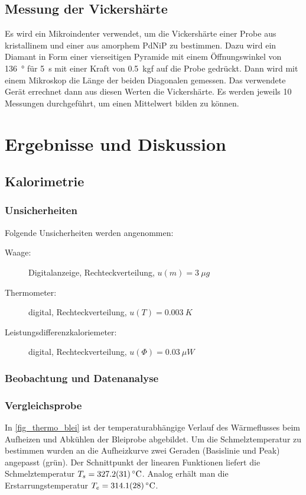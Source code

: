 \documentclass[
	a4paper,
	12pt,
	pagesize,
	ngerman
]{scrartcl}
\begin{document}
	\subsection{Messung der Vickershärte}
 	Es wird ein Mikroindenter verwendet, um die Vickershärte einer Probe aus kristallinem und einer aus amorphem PdNiP zu bestimmen. %
	Dazu wird ein Diamant in Form einer vierseitigen Pyramide mit einem Öffnungswinkel von \SI{136}{\degree} für \SI{5}{s} mit einer Kraft von \SI{0.5}{kgf} auf die Probe gedrückt.
	Dann wird mit einem Mikroskop die Länge der beiden Diagonalen gemessen.
	Das verwendete Gerät errechnet dann aus diesen Werten die Vickershärte.
	Es werden jeweils \num{10} Messungen durchgeführt, um einen Mittelwert bilden zu können.

	\section{Ergebnisse und Diskussion}

	\subsection{Kalorimetrie}
	\subsubsection{Unsicherheiten}
	Folgende Unsicherheiten werden angenommen:
	\begin{description}
		\item[Waage:]  Digitalanzeige, Rechteckverteilung, $u(m)=\SI{3}{\mu g}$
		\item[Thermometer:] digital, Rechteckverteilung, $u(T)=\SI{0.003}{K}$ %
		\item[Leistungsdifferenzkaloriemeter:] digital, Rechteckverteilung, $u(\Phi)=\SI{0.03}{\mu W}$ %
	\end{description}
	\subsubsection{Beobachtung und Datenanalyse}
	\subsubsection*{Vergleichsprobe} \label{ssss_vergleich}
	In \cref{fig_thermo_blei} ist der temperaturabhängige Verlauf des Wärmeflusses beim Aufheizen und Abkühlen  der Bleiprobe abgebildet.
	Um die Schmelztemperatur zu bestimmen wurden an die Aufheizkurve zwei Geraden (Basislinie und Peak) angepasst (grün). %
	Der Schnittpunkt der linearen Funktionen liefert die Schmelztemperatur $T_s= \SI{327.2+-3.1}{\celsius}$.
	Analog erhält man die Erstarrungstemperatur $T_e = \SI{314.1+-2.8}{\celsius}$.
\end{document}

